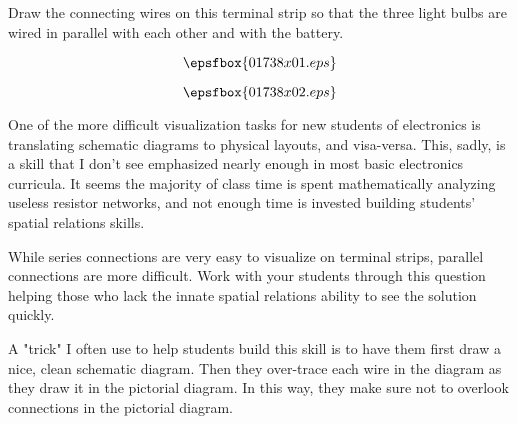 

Draw the connecting wires on this terminal strip so that the three light bulbs are wired in parallel with each other and with the battery.

$$\epsfbox{01738x01.eps}$$







$$\epsfbox{01738x02.eps}$$







One of the more difficult visualization tasks for new students of electronics is translating schematic diagrams to physical layouts, and visa-versa.  This, sadly, is a skill that I don't see emphasized nearly enough in most basic electronics curricula.  It seems the majority of class time is spent mathematically analyzing useless resistor networks, and not enough time is invested building students' spatial relations skills.

While series connections are very easy to visualize on terminal strips, parallel connections are more difficult.  Work with your students through this question helping those who lack the innate spatial relations ability to see the solution quickly.

A "trick" I often use to help students build this skill is to have them first draw a nice, clean schematic diagram.  Then they over-trace each wire in the diagram as they draw it in the pictorial diagram.  In this way, they make sure not to overlook connections in the pictorial diagram.




